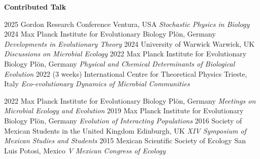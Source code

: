 \documentclass[]{friggeri-cv} %
\begin{document}
\textbf{Contributed Talk}

\begin{entrylist}
\entry
{2025}
{}
{Gordon Research Conference}
{Ventura, USA}
{{\normalsize\emph{Stochastic Physics in Biology}}}
{\vspace{-3mm}}
\entry
{2024}
{}%
{Max Planck Institute for Evolutionary Biology}
{Plön, Germany}
{{\normalsize\emph{Developments in Evolutionary Theory}}}
{\vspace{-3mm}}
\entry
{2024}
{}%
{University of Warwick}
{Warwick, UK}
{{\normalsize\emph{Discussions on Microbial Ecology}}}
{\vspace{-3mm}}
\entry
{2022}
{}%
{Max Planck Institute for Evolutionary Biology}
{Plön, Germany}
{{\normalsize\emph{Physical and Chemical Determinants of Biological Evolution}}}
{\vspace{-3mm}}
\entry
{2022}
{(3 weeks)}
{International Centre for Theoretical Physics}
{Trieste, Italy}
{{\normalsize\emph{Eco-evolutionary Dynamics of Microbial Communities}}}
{\vspace{-3mm}}
\end{entrylist}
\begin{entrylist}
\entry
{2022}
{}%
{Max Planck Institute for Evolutionary Biology}
{Plön, Germany}
{{\normalsize\emph{Meetings on Microbial Ecology and Evolution}}}
{\vspace{-3mm}}
\entry
{2019}
{}%
{Max Planck Institute for Evolutionary Biology}
{Plön, Germany}
{{\normalsize\emph{Evolution of Interacting Populations}}}
{\vspace{-3mm}}
\entry
{2016}
{}%
{Society of Mexican Students in the United Kingdom}
{Edinburgh, UK}
{{\normalsize\emph{XIV Symposium of Mexican Studies and Students}}}
{\vspace{-3mm}}
\entry
{2015}
{}%
{Mexican Scientific Society of Ecology}
{San Luis Potosi, Mexico}
{{\normalsize\emph{V Mexican Congress of Ecology}}}
{\vspace{-3mm}}
\end{entrylist}
\end{document}
